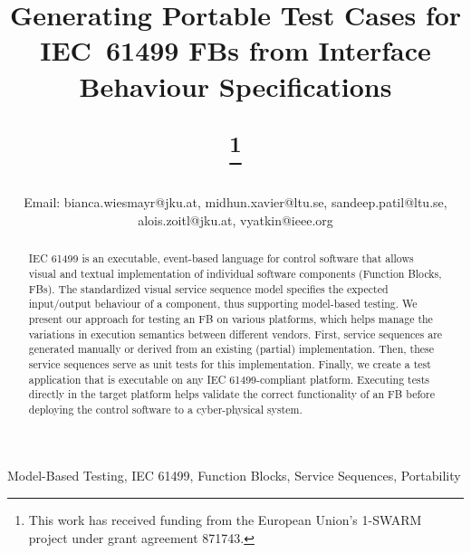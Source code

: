 \documentclass[conference]{IEEEtran}
\begin{document}
\title{Generating Portable Test Cases for IEC~61499 FBs from Interface Behaviour Specifications

\thanks{This work has received funding from the European Union's 1-SWARM project under grant agreement 871743.}}
\author{








 Email: bianca.wiesmayr@jku.at, midhun.xavier@ltu.se, sandeep.patil@ltu.se, alois.zoitl@jku.at, vyatkin@ieee.org
}



\maketitle

\begin{abstract}
IEC 61499 is an executable, event-based language for control software that allows visual and textual implementation of individual software components (Function Blocks, FBs). The standardized visual service sequence model specifies the expected input/output behaviour of a component, thus supporting model-based testing. We present our approach for testing an FB on various platforms, which helps manage the variations in execution semantics between different vendors. First, service sequences are generated manually or derived from an existing (partial) implementation. Then, these service sequences serve as unit tests for this implementation. Finally, we create a test application that is executable on any IEC 61499-compliant platform. Executing tests directly in the target platform helps validate the correct functionality of an FB before deploying the control software to a cyber-physical system. 
\end{abstract}
\begin{IEEEkeywords}
    Model-Based Testing, IEC 61499, Function Blocks, Service Sequences, Portability
\end{IEEEkeywords}
\end{document}
